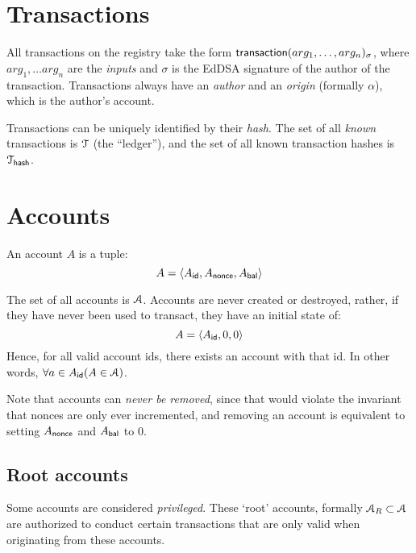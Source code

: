 \section{Transactions}
\label{s:transactions}

All transactions on the registry take the form $\operatorname{\mathsf{transaction}}\lparen arg_1, \ldots,
arg_n\rparen_\sigma$, where $arg_1, \ldots arg_n$ are the \emph{inputs} and $\sigma$ is the
\textsf{EdDSA} signature of the author of the transaction. Transactions always
have an \emph{author} and an \emph{origin} (formally $\alpha$), which is the
author's account.

Transactions can be uniquely identified by their \emph{hash}. The set of all
\emph{known} transactions is $\mathcal{T}$ (the ``ledger''), and the set of all known
transaction hashes is $\mathcal{T}_{\mathsf{hash}}$.

\section{Accounts}
An account $A$ is a tuple:
\[
    A = \langle A_{\mathsf{id}}, A_{\mathsf{nonce}}, A_{\mathsf{bal}}\rangle
\]

The set of all accounts is $\mathcal{A}$. Accounts are never created or destroyed,
rather, if they have never been used to transact, they have an initial state of:
\[
    A = \langle A_{\mathsf{id}}, 0, 0\rangle
\]
Hence, for all valid account ids, there exists an account with that id. In other
words, $\forall a \in A_{\mathsf{id}} (A \in \mathcal{A})$.

Note that accounts can \emph{never be removed}, since that would violate the
invariant that nonces are only ever incremented, and removing an account is
equivalent to setting $A_{\mathsf{nonce}}$ and $A_{\mathsf{bal}}$ to $0$.

\subsection{Root accounts}
Some accounts are considered \emph{privileged}. These `root' accounts,
formally $\mathcal{A}_R \subset \mathcal{A}$ are authorized to conduct certain transactions
that are only valid when originating from these accounts.

